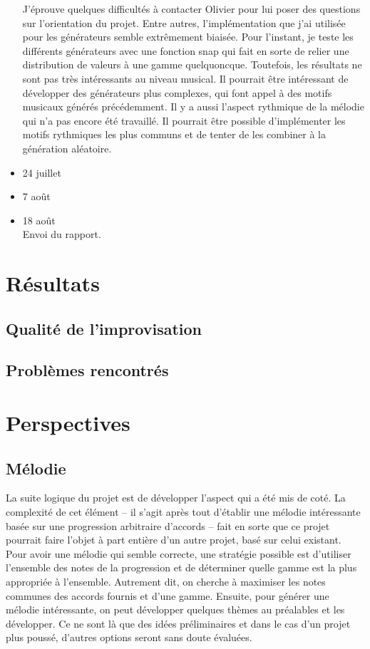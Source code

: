 \documentclass[letterpaper,12pt]{scrartcl}
\begin{document}
\begin{itemize}
	J'éprouve quelques difficultés à contacter Olivier pour lui poser des questions sur l'orientation du projet. Entre autres, l'implémentation que j'ai utilisée pour les générateurs semble extrêmement biaisée. Pour l'instant, je teste les différents générateurs avec une fonction snap qui fait en sorte de relier une distribution de valeurs à une gamme quelquoncque. Toutefois, les résultats ne sont pas très intéressants au niveau musical. Il pourrait être intéressant de développer des générateurs plus complexes, qui font appel à des motifs musicaux générés précédemment. Il y a aussi l'aspect rythmique de la mélodie qui n'a pas encore été travaillé. Il pourrait être possible d'implémenter les motifs rythmiques les plus communs et de tenter de les combiner à la génération aléatoire.
	\item 24 juillet
	
	\item 7 août
	
	\item 18 août\\
	Envoi du rapport.
	\end{itemize}
	\section{Résultats}
	\subsection{Qualité de l'improvisation}
	\subsection{Problèmes rencontrés}
	\section{Perspectives}
		\subsection{Mélodie}
		La suite logique du projet est de développer l'aspect qui a été mis de coté. La complexité de cet élément -- il s'agit après tout d'établir une mélodie intéressante basée sur une progression arbitraire d'accords -- fait en sorte que ce projet pourrait faire l'objet à part entière d'un autre projet, basé sur celui existant. Pour avoir une mélodie qui semble correcte, une stratégie possible est d'utiliser l'ensemble des notes de la progression et de déterminer quelle gamme est la plus appropriée à l'ensemble. Autrement dit, on cherche à maximiser les notes communes des accords fournis et d'une gamme. Ensuite, pour générer une mélodie intéressante, on peut développer quelques thèmes au préalables et les développer. Ce ne sont là que des idées préliminaires et dans le cas d'un projet plus poussé, d'autres options seront sans doute évaluées.
\end{document}
